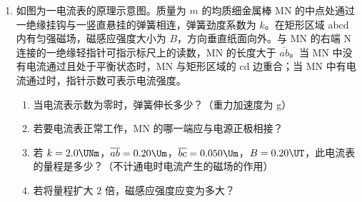 \documentclass[\gkver]{gaokaozhenti}
\begin{document}
\begin{enumerate}
{（1）设放置质量 $m$ 的物体时弹簧压缩量为 $x$，由平衡条件得 $mg=kx$，又 $U=\frac{x}{l}E$，解得 $m=\frac{lk}{Eg}U$。

（2）①用描点法作图，作出的图像如图所示。


②选取 $(0,0)$、$(0.90,9)$ 两点，则斜率为 $\frac{\Delta m}{\Delta U}=\frac{9-0}{0.90-0}\Ukg/\UV=10.0\Ukg/\UV$。

③因 $m=\frac{lk}{Eg}U$，故 $\frac{lk}{Eg}=\frac{\Delta m}{\Delta U}$，$k=\frac{\Delta m}{\Delta U}\cdot\frac{Eg}{l}=10.0\times\frac{1.50\times9.80}{0.120}\UNm\approx1.23\times10^{3}\UNm$。
}

\item
如图为一电流表的原理示意图。质量为 $m$ 的均质细金属棒 MN 的中点处通过一绝缘挂钩与一竖直悬挂的弹簧相连，弹簧劲度系数为 $k$。在矩形区域 abcd 内有匀强磁场，磁感应强度大小为 $B$，方向垂直纸面向外。与 MN 的右端 N 连接的一绝缘轻指针可指示标尺上的读数，MN 的长度大于 $\overline{ab}$。当 MN 中没有电流通过且处于平衡状态时，MN 与矩形区域的 cd 边重合；当 MN 中有电流通过时，指针示数可表示电流强度。


\begin{enumerate}
	\item
	当电流表示数为零时，弹簧伸长多少？（重力加速度为 g）

	\item
	若要电流表正常工作，MN 的哪一端应与电源正极相接？

	\item
	若 $k=2.0\UNm$，$\overline{ab}=0.20\Um$，$\overline{bc}=0.050\Um$，$B=0.20\UT$，此电流表的量程是多少？（不计通电时电流产生的磁场的作用）

	\item
	若将量程扩大 2 倍，磁感应强度应变为多大？
\end{enumerate}



\end{enumerate}
\end{document}

